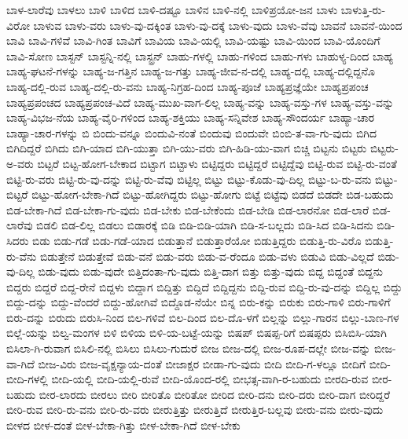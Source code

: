 {ಬಾಳ-ಲಾರೆವು
ಬಾಳಲು
ಬಾಳಿ
ಬಾಳಿದ
ಬಾಳಿ-ದಷ್ಟೂ
ಬಾಳಿನ
ಬಾಳಿ-ನಲ್ಲಿ
ಬಾಳಿಪ್ರಯೋ-ಜನ
ಬಾಳು
ಬಾಳುತ್ತಿ-ರು-ವಿರೋ
ಬಾಳುವ
ಬಾಳು-ವರು
ಬಾಳು-ವು-ದಕ್ಕಿಂತ
ಬಾಳು-ವು-ದಕ್ಕೆ
ಬಾಳು-ವುದು
ಬಾಳು-ವೆವು
ಬಾವನೆ
ಬಾವನೆ-ಯಿಂದ
ಬಾವಿ
ಬಾವಿ-ಗಳಿವೆ
ಬಾವಿ-ಗಿಂತ
ಬಾವಿಗೆ
ಬಾವಿಯ
ಬಾವಿ-ಯಲ್ಲಿ
ಬಾವಿ-ಯಷ್ಟು
ಬಾವಿ-ಯಿಂದ
ಬಾವಿ-ಯೊಂದಿಗೆ
ಬಾವಿ-ಸೋಣ
ಬಾಸ್ಟನ್
ಬಾಸ್ಟನ್ನಿ-ನಲ್ಲಿ
ಬಾಸ್ಟ್ರನ್
ಬಾಹು-ಗಳಲ್ಲಿ
ಬಾಹು-ಗಳಿಂದ
ಬಾಹು-ಗಳು
ಬಾಹುಳ್ಯ-ದಿಂದ
ಬಾಹ್ಯ
ಬಾಹ್ಯ-ಘಟನೆ-ಗಳನ್ನು
ಬಾಹ್ಯ-ಜ-ಗತ್ತಿನ
ಬಾಹ್ಯ-ಜ-ಗತ್ತು
ಬಾಹ್ಯ-ಜೀವ-ನ-ದಲ್ಲಿ
ಬಾಹ್ಯ-ದಲ್ಲಿ
ಬಾಹ್ಯ-ದಲ್ಲಿದ್ದನೊ
ಬಾಹ್ಯ-ದಲ್ಲಿ-ರುವ
ಬಾಹ್ಯ-ದಲ್ಲಿ-ರು-ವನು
ಬಾಹ್ಯ-ನಿಗ್ರಹ-ದಿಂದ
ಬಾಹ್ಯ-ಪೂಜೆ
ಬಾಹ್ಯಪ್ರಜ್ಞೆಯೇ
ಬಾಹ್ಯಪ್ರಪಂಚ
ಬಾಹ್ಯಪ್ರಪಂಚದ
ಬಾಹ್ಯಪ್ರಪಂಚ-ವಿದೆ
ಬಾಹ್ಯ-ಮುಖ-ವಾಗ-ಲಿಲ್ಲ
ಬಾಹ್ಯ-ವನ್ನು
ಬಾಹ್ಯ-ವಸ್ತು-ಗಳ
ಬಾಹ್ಯ-ವಸ್ತು-ವನ್ನು
ಬಾಹ್ಯ-ವಿಭಜ-ನೆಯ
ಬಾಹ್ಯ-ವೈರಿ-ಗಳಿಂದ
ಬಾಹ್ಯ-ಶಕ್ತಿಯು
ಬಾಹ್ಯ-ಸನ್ನಿವೇಶ
ಬಾಹ್ಯ-ಸೌಂದರ್ಯ
ಬಾಹ್ಯಾ-ಚಾರ
ಬಾಹ್ಯಾ-ಚಾರ-ಗಳನ್ನು
ಬಿ
ಬಿಂದು-ವನ್ನೂ
ಬಿಂದುವಿ-ನಂತೆ
ಬಿಂದುವು
ಬಿಂದುವೇ
ಬಿಂಬಿ-ತ-ವಾ-ಗು-ವುದು
ಬಿಗಿದ
ಬಿಗಿದಿದ್ದರೆ
ಬಿಗಿದು
ಬಿಗಿ-ಯಾದ
ಬಿಗಿ-ಯುತ್ತಾ
ಬಿಗಿ-ಯು-ವರು
ಬಿಗಿ-ಹಿಡಿ-ಯು-ವಾಗ
ಬಿಚ್ಚಿ
ಬಿಟ್ಟನು
ಬಿಟ್ಟರು
ಬಿಟ್ಟರು-ಅ-ವರು
ಬಿಟ್ಟರೆ
ಬಿಟ್ಟ-ಹೋಗ-ಬೇಕಾದ
ಬಿಟ್ಟಾಗ
ಬಿಟ್ಟಾಳು
ಬಿಟ್ಟಿದ್ದರು
ಬಿಟ್ಟಿದ್ದರೆ
ಬಿಟ್ಟಿದ್ದೆವು
ಬಿಟ್ಟಿ-ರುವ
ಬಿಟ್ಟಿ-ರು-ವಂತೆ
ಬಿಟ್ಟಿ-ರು-ವರು
ಬಿಟ್ಟಿ-ರು-ವು-ದನ್ನು
ಬಿಟ್ಟಿ-ರು-ವೆವು
ಬಿಟ್ಟಿಲ್ಲ
ಬಿಟ್ಟು
ಬಿಟ್ಟು-ಕೊಡು-ವು-ದಿಲ್ಲ
ಬಿಟ್ಟು-ಬ-ರು-ವನು
ಬಿಟ್ಟು-ಬಿಟ್ಟರೆ
ಬಿಟ್ಟು-ಹೋಗ-ಬೇಕಾ-ಗಿದೆ
ಬಿಟ್ಟು-ಹೋಗಿದ್ದರು
ಬಿಟ್ಟು-ಹೋಗು
ಬಿಟ್ಟೆ
ಬಿಟ್ಟೆವು
ಬಿಡದೆ
ಬಿಡದೇ
ಬಿಡ-ಬಹುದು
ಬಿಡ-ಬೇಕಾ-ಗಿದೆ
ಬಿಡ-ಬೇಕಾ-ಗು-ವುದು
ಬಿಡ-ಬೇಕು
ಬಿಡ-ಬೇಕೆಂದು
ಬಿಡ-ಬೇಡಿ
ಬಿಡ-ಲಾರನೋ
ಬಿಡ-ಲಾರೆ
ಬಿಡ-ಲಾರೆವು
ಬಿಡಲಿ
ಬಿಡ-ಲಿಲ್ಲ
ಬಿಡಲು
ಬಿಡಾರಕ್ಕೆ
ಬಿಡಿ
ಬಿಡಿ-ಬಿಡಿ-ಯಾಗಿ
ಬಿಡಿ-ಸ-ಬಲ್ಲದು
ಬಿಡಿ-ಸಿದ
ಬಿಡಿ-ಸಿದನು
ಬಿಡಿ-ಸಿದರು
ಬಿಡು
ಬಿಡು-ಗಡೆ
ಬಿಡು-ಗಡೆ-ಯಾದ
ಬಿಡುತ್ತಾನೆ
ಬಿಡುತ್ತಾರೆಯೋ
ಬಿಡುತ್ತಿದ್ದರು
ಬಿಡುತ್ತಿ-ರು-ವಿರೊ
ಬಿಡುತ್ತಿ-ರು-ವೆನು
ಬಿಡುತ್ತೇನೆ
ಬಿಡುತ್ತೇವೆ
ಬಿಡು-ವನೆ
ಬಿಡು-ವರು
ಬಿಡು-ವ-ರೆಂದೂ
ಬಿಡು-ವಳು
ಬಿಡುವಿ
ಬಿಡು-ವಿಲ್ಲದೆ
ಬಿಡು-ವು-ದಿಲ್ಲ
ಬಿಡು-ವುದು
ಬಿಡು-ವುದೇ
ಬಿತ್ತಿದಂತಾ-ಗು-ವುದು
ಬಿತ್ತಿ-ದಾಗ
ಬಿತ್ತು
ಬಿತ್ತು-ವುದು
ಬಿದ್ದ
ಬಿದ್ದಂತೆ
ಬಿದ್ದನು
ಬಿದ್ದರು
ಬಿದ್ದರೆ
ಬಿದ್ದ-ರೇನೆ
ಬಿದ್ದಳು
ಬಿದ್ದಾಗ
ಬಿದ್ದಿತ್ತು
ಬಿದ್ದಿದೆ
ಬಿದ್ದಿದ್ದನು
ಬಿದ್ದಿ-ರುವ
ಬಿದ್ದಿ-ರು-ವು-ದನ್ನು
ಬಿದ್ದಿಲ್ಲ
ಬಿದ್ದು
ಬಿದ್ದು-ದನ್ನು
ಬಿದ್ದು-ವೆಂದರೆ
ಬಿದ್ದು-ಹೋಗಿವೆ
ಬಿದ್ದೊಡ-ನೆಯೇ
ಬಿನ್ನ
ಬಿರು-ಕನ್ನು
ಬಿರುಕು
ಬಿರು-ಗಾಳಿ
ಬಿರು-ಗಾಳಿಗೆ
ಬಿರು-ದನ್ನು
ಬಿರುದು
ಬಿರುಸಿ-ನಿಂದ
ಬಿಲ-ಗಳಿವೆ
ಬಿಲ-ದಿಂದ
ಬಿಲ-ದೊ-ಳಗೆ
ಬಿಲ್ಲನ್ನು
ಬಿಲ್ಲು-ಗಾರನ
ಬಿಲ್ಲು-ಬಾಣ-ಗಳ
ಬಿಲ್ಲೆ-ಯನ್ನು
ಬಿಲ್ವ-ಮಂಗಳ
ಬಿಳಿ
ಬಿಳಿಯ
ಬಿಳಿ-ಯ-ಬಟ್ಟೆ-ಯನ್ನು
ಬಿಷಪ್
ಬಿಷಪ್ಪ-ರಿಗೆ
ಬಿಷಪ್ಪರು
ಬಿಸಿಬಿಸಿ-ಯಾಗಿ
ಬಿಸಿಲಾ-ಗಿ-ರುವಾಗ
ಬಿಸಿಲಿ-ನಲ್ಲಿ
ಬಿಸಿಲು
ಬಿಸಿಲು-ಗುದುರೆ
ಬೀಜ
ಬೀಜ-ದಲ್ಲಿ
ಬೀಜ-ರೂಪ-ದಲ್ಲೇ
ಬೀಜ-ವನ್ನು
ಬೀಜ-ವಾ-ಗಿದೆ
ಬೀಜ-ವಿರು
ಬೀಜ-ವೃಕ್ಷನ್ಯಾಯ-ದಂತೆ
ಬೀಜಾಕ್ಷರ
ಬೀಡಾ-ಗು-ವುದು
ಬೀದಿ
ಬೀದಿ-ಗ-ಳಲ್ಲೂ
ಬೀದಿಗೆ
ಬೀದಿ-ಬೀದಿ-ಗಳಲ್ಲಿ
ಬೀದಿ-ಯಲ್ಲಿ
ಬೀದಿ-ಯಲ್ಲಿ-ರುವೆ
ಬೀದಿ-ಯೊಂದ-ರಲ್ಲಿ
ಬೀಭತ್ಸ-ವಾಗಿ-ರ-ಬಹುದು
ಬೀರದಿ-ರುವ
ಬೀರ-ಬಹುದು
ಬೀರ-ಲಾರದು
ಬೀರಲು
ಬೀರಿ
ಬೀರಿತೊ
ಬೀರಿತೋ
ಬೀರಿದ
ಬೀರಿ-ದನು
ಬೀರಿ-ದರು
ಬೀರಿ-ದಾಗ
ಬೀರಿದ್ದರೆ
ಬೀರಿ-ರುವ
ಬೀರಿ-ರು-ವನು
ಬೀರಿ-ರು-ವರು
ಬೀರುತ್ತಿತ್ತು
ಬೀರುತ್ತಿದೆ
ಬೀರುತ್ತಿರ-ಬಲ್ಲವು
ಬೀರು-ವನು
ಬೀರು-ವುದು
ಬೀಳದ
ಬೀಳ-ದಂತೆ
ಬೀಳ-ಬೇಕಾ-ಗಿತ್ತು
ಬೀಳ-ಬೇಕಾ-ಗಿದೆ
ಬೀಳ-ಬೇಕು
}

